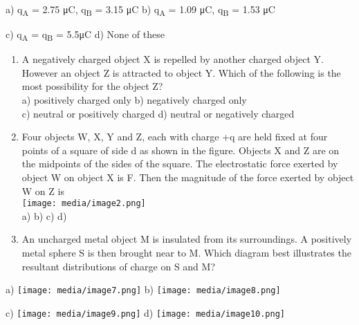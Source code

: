 a) q\textsubscript{A} = 2.75 μC, q\textsubscript{B} = 3.15 μC b)
q\textsubscript{A} = 1.09 μC, q\textsubscript{B} = 1.53 μC

c) q\textsubscript{A} = q\textsubscript{B} = 5.5μC d) None of these

\begin{enumerate}
\def\labelenumi{\arabic{enumi}.}
\setcounter{enumi}{1}
\item
  A negatively charged object X is repelled by another charged object Y.
  However an object Z is attracted to object Y. Which of the following
  is the most possibility for the object Z?\\
  a) positively charged only b) negatively charged only\\
  c) neutral or positively charged d) neutral or negatively charged
\item
  Four objects W, X, Y and Z, each with charge +q are held fixed at four
  points of a square of side d as shown in the figure. Objects X and Z
  are on the midpoints of the sides of the square. The electrostatic
  force exerted by object W on object X is F. Then the magnitude of the
  force exerted by object W on Z is\\
  \texttt{[image: media/image2.png]}\\
  a) 
  b) 
  c) 
  d) 
\item
  An uncharged metal object M is insulated from its surroundings. A
  positively metal sphere S is then brought near to M. Which diagram
  best illustrates the resultant distributions of charge on S and M?
\end{enumerate}

a) \texttt{[image: media/image7.png]}
b) \texttt{[image: media/image8.png]}

c) \texttt{[image: media/image9.png]} d)
\texttt{[image: media/image10.png]}

